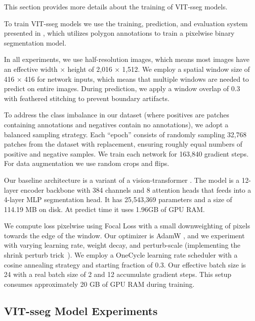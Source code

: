 This section provides more details about the training of VIT-sseg models.

To train VIT-sseg models we use the training, prediction, and evaluation system presented in
  \cite{Greenwell_2024_WACV, crall_geowatch_2024}, which utilizes polygon annotations to train a pixelwise
  binary segmentation model.


In all experiments, we use half-resolution images, which means most images have an effective width $\times$
  height of 2,016 $\times$ 1,512.
We employ a spatial window size of 416 $\times$ 416 for network inputs, which means that multiple windows
  are needed to predict on entire images.
During prediction, we apply a window overlap of 0.3 with feathered stitching to prevent boundary artifacts.

To address the class imbalance in our dataset (where positives are patches containing annotations and
  negatives contain no annotations), we adopt a balanced sampling strategy.
Each ``epoch'' consists of randomly sampling 32,768 patches from the dataset with replacement, ensuring
  roughly equal numbers of positive and negative samples.
We train each network for 163,840 gradient steps.
For data augmentation we use random crops and flips.

Our baseline architecture is a variant \cite{bertasius2021space,Greenwell_2024_WACV} of a vision-transformer
  \cite{dosovitskiy_image_2021}.
The model is a 12-layer encoder backbone with 384 channels and 8 attention heads that feeds into a 4-layer
  MLP segmentation head.
It has 25,543,369 parameters and a size of 114.19 MB on disk.
At predict time it uses 1.96GB of GPU RAM.

We compute loss pixelwise using Focal Loss \cite{ross2017focal} with a small downweighting of pixels towards
  the edge of the window.
Our optimizer is AdamW \cite{loshchilov_decoupled_2018}, and we experiment with varying learning rate,
  weight decay, and perturb-scale (implementing the shrink perturb trick~\cite{ash_warm_starting_2020,dohare_loss_2023}).
We employ a OneCycle learning rate scheduler \cite{smith2019super} with a cosine annealing strategy and
  starting fraction of 0.3.
Our effective batch size is 24 with a real batch size of 2 and 12 accumulate gradient steps.
This setup consumes approximately 20 GB of GPU RAM during training.

\subsection{VIT-sseg Model Experiments}

